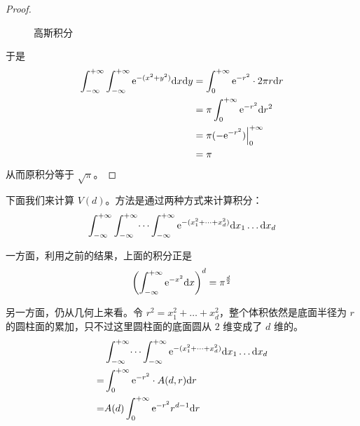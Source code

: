\begin{proof}
\begin{figure}[htbp]
        \caption{高斯积分}
    \end{figure}

    于是
    \begin{align*}
        \int_{-\infty}^{+\infty}\int_{-\infty}^{+\infty}{\mathrm{e}}^{-(x^{2}+y^{2})}\mathrm{d} x\mathrm{d} y &= \int_{0}^{+\infty}{\mathrm{e}}^{-r^{2}} \cdot 2\pi r \mathrm{d} r \\
        &= \pi\int_{0}^{+\infty}{\mathrm{e}}^{-r^{2}}\mathrm{d} r^{2} \\
        &= \pi(-{\mathrm{e}}^{-r^{2}})\Big|_{0}^{+\infty} \\
        &= \pi
    \end{align*}
    从而原积分等于 $\sqrt{\pi}$。
\end{proof}

下面我们来计算 $V(d)$。方法是通过两种方式来计算积分：
\[
    \int_{-\infty}^{+\infty}\int_{-\infty}^{+\infty}\dots\int_{-\infty}^{+\infty}\mathrm{e}^{-(x_{1}^{2}+\dots+x_{d}^{2})}\mathrm{d} x_{1}\dots \mathrm{d} x_{d}
\]

一方面，利用之前的结果，上面的积分正是
\[
	\left(\int_{-\infty}^{+\infty}\mathrm{e}^{-x^{2}}\mathrm{d} x\right)^{d}=\pi^{\frac{d}{2}}
\]

另一方面，仍从几何上来看。令 $r^{2}=x_{1}^{2}+\dots+x_{d}^{2}$，整个体积依然是底面半径为 $r$ 的圆柱面的累加，只不过这里圆柱面的底面圆从 $2$ 维变成了 $d$ 维的。
\begin{align*}
	&\int_{-\infty}^{+\infty}\dots\int_{-\infty}^{+\infty}\mathrm{e}^{-(x_{1}^{2}+\dots+x_{d}^{2})}\mathrm{d} x_{1}\dots \mathrm{d} x_{d} \\
	= &\int_{0}^{+\infty}\mathrm{e}^{-r^{2}}\cdot A(d,r) \mathrm{d} r \\
    = &A(d) \int_{0}^{+\infty}\mathrm{e}^{-r^{2}}r^{d-1}\mathrm{d} r
\end{align*}

